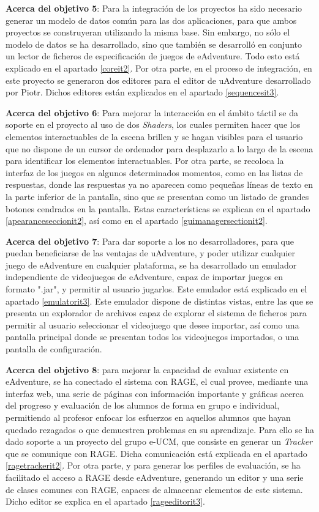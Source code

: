 \textbf{Acerca del objetivo 5}: Para la integración de los proyectos ha sido necesario generar un modelo de datos común para las dos aplicaciones, para que ambos proyectos se construyeran utilizando la misma base. Sin embargo, no sólo el modelo de datos se ha desarrollado, sino que también se desarrolló en conjunto un lector de ficheros de especificación de juegos de eAdventure. Todo esto está explicado en el apartado \ref{coreit2}. Por otra parte, en el proceso de integración, en este proyecto se generaron dos editores para el editor de uAdventure desarrollado por Piotr. Dichos editores están explicados en el apartado \ref{sequencesit3}.

\textbf{Acerca del objetivo 6}: Para mejorar la interacción en el ámbito táctil se da soporte en el proyecto al uso de dos \textit{Shaders}, los cuales permiten hacer que los elementos interactuables de la escena brillen y se hagan visibles para el usuario que no dispone de un cursor de ordenador para desplazarlo a lo largo de la escena para identificar los elementos interactuables. Por otra parte, se recoloca la interfaz de los juegos en algunos determinados momentos, como en las listas de respuestas, donde las respuestas ya no aparecen como pequeñas líneas de texto en la parte inferior de la pantalla, sino que se presentan como un listado de grandes botones cendrados en la pantalla. Estas características se explican en el apartado \ref{apearanceseccionit2}, así como en el apartado \ref{guimanagersectionit2}.

\textbf{Acerca del objetivo 7}: Para dar soporte a los no desarrolladores, para que puedan beneficiarse de las ventajas de uAdventure, y poder utilizar cualquier juego de eAdventure en cualquier plataforma, se ha desarrollado un emulador independiente de videojuegos de eAdventure, capaz de importar juegos en formato ".jar", y permitir al usuario jugarlos. Este emulador está explicado en el apartado \ref{emulatorit3}. Este emulador dispone de distintas vistas, entre las que se presenta un explorador de archivos capaz de explorar el sistema de ficheros para permitir al usuario seleccionar el videojuego que desee importar, así como una pantalla principal donde se presentan todos los videojuegos importados, o una pantalla de configuración.

\textbf{Acerca del objetivo 8}: para mejorar la capacidad de evaluar existente en eAdventure, se ha conectado el sistema con RAGE, el cual provee, mediante una interfaz web, una serie de páginas con información importante y gráficas acerca del progreso y evaluación de los alumnos de forma en grupo e individual, permitiendo al profesor enfocar los esfuerzos en aquellos alumnos que hayan quedado rezagados o que demuestren problemas en su aprendizaje. Para ello se ha dado soporte a un proyecto del grupo e-UCM, que consiste en generar un \textit{Tracker} que se comunique con RAGE. Dicha comunicación está explicada en el apartado \ref{ragetrackerit2}. Por otra parte, y para generar los perfiles de evaluación, se ha facilitado el acceso a RAGE desde eAdventure, generando un editor y una serie de clases comunes con RAGE, capaces de almacenar elementos de este sistema. Dicho editor se explica en el apartado \ref{rageeditorit3}.

